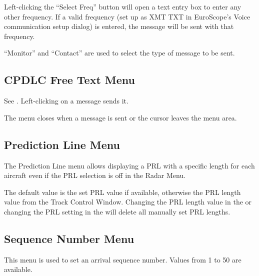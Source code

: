 \documentclass[a4paper,oneside,11pt]{memoir}
\begin{document}
\bigskip

Left-clicking the “Select Freq” button will open a text entry box to enter any other frequency. If a valid frequency (set up as XMT TXT in EuroScope’s Voice communication setup dialog) is entered, the message will be sent with that frequency.

\bigskip

“Monitor” and “Contact” are used to select the type of message to be sent.

\subsection{CPDLC Free Text Menu}
\label{menu:dlftm}

See . Left-clicking on a message sends it.

\bigskip

The menu closes when a message is sent or the cursor leaves the menu area.

\subsection{Prediction Line Menu}
\label{menu:prl}


The Prediction Line menu allows displaying a PRL with a specific length for each aircraft even if the PRL selection is off in the Radar Menu.

\bigskip

The default value is the set PRL value if available, otherwise the PRL length value from the Track Control Window. Changing the PRL length value in the  or changing the PRL setting in the  will delete all manually set PRL lengths.

\subsection{Sequence Number Menu}
\label{menu:seq}


This menu is used to set an arrival sequence number. Values from 1 to 50 are available.

\bigskip

\end{document}
